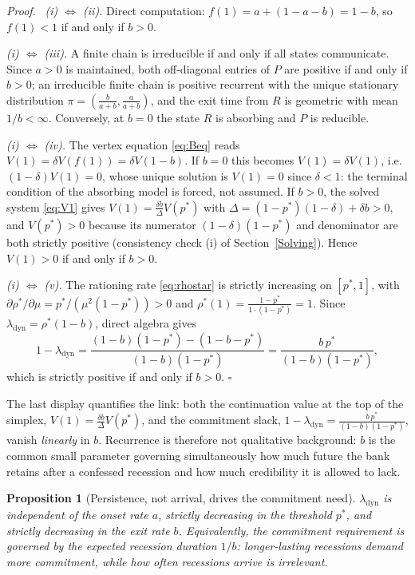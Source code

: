 \documentclass[12pt]{article}
\newtheorem{prop}{Proposition}
\newenvironment{pf}{\par\noindent\textit{Proof.}\ \ignorespaces}{\hfill$\square$\par\medskip}
\begin{document}
\begin{pf}
\emph{(i) $\Leftrightarrow$ (ii).} Direct computation: $f(1)=a+(1-a-b)=1-b$, so $f(1)<1$ if and only if $b>0$.

\emph{(i) $\Leftrightarrow$ (iii).} A finite chain is irreducible if and only if all states communicate. Since $a>0$ is maintained, both off-diagonal entries of $P$ are positive if and only if $b>0$; an irreducible finite chain is positive recurrent with the unique stationary distribution $\pi=(\tfrac{b}{a+b},\tfrac{a}{a+b})$, and the exit time from $R$ is geometric with mean $1/b<\infty$. Conversely, at $b=0$ the state $R$ is absorbing and $P$ is reducible.

\emph{(i) $\Leftrightarrow$ (iv).} The vertex equation \eqref{eq:Beq} reads $V(1)=\delta V(f(1))=\delta V(1-b)$. If $b=0$ this becomes $V(1)=\delta V(1)$, i.e.\ $(1-\delta)V(1)=0$, whose unique solution is $V(1)=0$ since $\delta<1$: the terminal condition of the absorbing model is forced, not assumed. If $b>0$, the solved system \eqref{eq:V1} gives $V(1)=\tfrac{\delta b}{\Delta}V(p^*)$ with $\Delta=(1-p^*)(1-\delta)+\delta b>0$, and $V(p^*)>0$ because its numerator $(1-\delta)(1-p^*)$ and denominator are both strictly positive (consistency check (i) of Section~\ref{Solving}). Hence $V(1)>0$ if and only if $b>0$.

\emph{(i) $\Leftrightarrow$ (v).} The rationing rate \eqref{eq:rhostar} is strictly increasing on $[p^*,1]$, with $\partial\rho^*/\partial\mu=p^*/(\mu^2(1-p^*))>0$ and $\rho^*(1)=\tfrac{1-p^*}{1\cdot(1-p^*)}=1$. Since $\lambda_{\mathrm{dyn}}=\rho^*(1-b)$, direct algebra gives
\[
1-\lambda_{\mathrm{dyn}}
=\frac{(1-b)(1-p^*)-(1-b-p^*)}{(1-b)(1-p^*)}
=\frac{b\,p^*}{(1-b)(1-p^*)},
\]
which is strictly positive if and only if $b>0$.
\end{pf}

The last display quantifies the link: both the continuation value at the top of the simplex, $V(1)=\tfrac{\delta b}{\Delta}V(p^*)$, and the commitment slack, $1-\lambda_{\mathrm{dyn}}=\tfrac{b\,p^*}{(1-b)(1-p^*)}$, vanish \emph{linearly} in $b$. Recurrence is therefore not qualitative background: $b$ is the common small parameter governing simultaneously how much future the bank retains after a confessed recession and how much credibility it is allowed to lack.

\begin{prop}[Persistence, not arrival, drives the commitment need]\label{prop:speed}
$\lambda_{\mathrm{dyn}}$ is independent of the onset rate $a$, strictly decreasing in the threshold $p^*$, and strictly decreasing in the exit rate $b$. Equivalently, the commitment requirement is governed by the expected recession duration $1/b$: longer-lasting recessions demand more commitment, while how often recessions arrive is irrelevant.
\end{prop}
\end{document}
